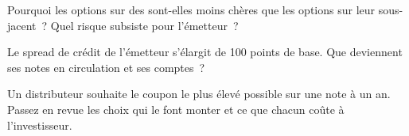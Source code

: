 \begin{interviewq}\label{iq:dv:the-structured-products-business:4}
Pourquoi les options sur des  sont-elles moins chères que les options sur leur sous-jacent~? Quel risque subsiste pour l'émetteur~?
\end{interviewq}

\begin{interviewq}\label{iq:dv:the-structured-products-business:5}
Le spread de crédit de l'émetteur s'élargit de 100 points de base. Que deviennent ses notes en circulation et ses comptes~?
\end{interviewq}

\begin{interviewq}\label{iq:dv:the-structured-products-business:6}
Un distributeur souhaite le coupon le plus élevé possible sur une note à un an. Passez en revue les choix qui le font monter et ce que chacun coûte à l'investisseur.
\end{interviewq}
